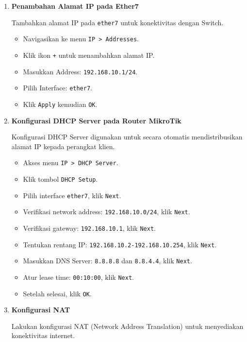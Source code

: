 \begin{enumerate}
    \item \textbf{Penambahan Alamat IP pada Ether7}

    Tambahkan alamat IP pada \texttt{ether7} untuk konektivitas dengan Switch.

    \begin{itemize}
        \item Navigasikan ke menu \texttt{IP > Addresses}.
        \item Klik ikon \texttt{+} untuk menambahkan alamat IP.
        \item Masukkan Address: \texttt{192.168.10.1/24}.
        \item Pilih Interface: \texttt{ether7}.
        \item Klik \texttt{Apply} kemudian \texttt{OK}.
    \end{itemize}

    \item \textbf{Konfigurasi DHCP Server pada Router MikroTik}

    Konfigurasi DHCP Server digunakan untuk secara otomatis mendistribusikan alamat IP kepada perangkat klien.

    \begin{itemize}
        \item Akses menu \texttt{IP > DHCP Server}.
        \item Klik tombol \texttt{DHCP Setup}.
        \item Pilih interface \texttt{ether7}, klik \texttt{Next}.
        \item Verifikasi network address: \texttt{192.168.10.0/24}, klik \texttt{Next}.
        \item Verifikasi gateway: \texttt{192.168.10.1}, klik \texttt{Next}.
        \item Tentukan rentang IP: \texttt{192.168.10.2-192.168.10.254}, klik \texttt{Next}.
        \item Masukkan DNS Server: \texttt{8.8.8.8} dan \texttt{8.8.4.4}, klik \texttt{Next}.
        \item Atur lease time: \texttt{00:10:00}, klik \texttt{Next}.
        \item Setelah selesai, klik \texttt{OK}.
    \end{itemize}

    \item \textbf{Konfigurasi NAT}

    Lakukan konfigurasi NAT (Network Address Translation) untuk menyediakan konektivitas internet.


\end{enumerate}
